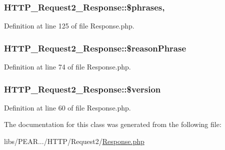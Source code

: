 \subsubsection[{\$phrases}]{\setlength{\rightskip}{0pt plus 5cm}H\+T\+T\+P\+\_\+\+Request2\+\_\+\+Response\+::\$phrases\hspace{0.3cm}{\ttfamily [static]}, {\ttfamily [protected]}}\label{classHTTP__Request2__Response_ad9a8fd735e8dc89eb7afc73750ec0bbc}


Definition at line 125 of file Response.\+php.

\hypertarget{classHTTP__Request2__Response_ab9faa50ba9b9f208a02a7c4ce75b391a}{}
\subsubsection[{\$reason\+Phrase}]{\setlength{\rightskip}{0pt plus 5cm}H\+T\+T\+P\+\_\+\+Request2\+\_\+\+Response\+::\$reason\+Phrase\hspace{0.3cm}{\ttfamily [protected]}}\label{classHTTP__Request2__Response_ab9faa50ba9b9f208a02a7c4ce75b391a}


Definition at line 74 of file Response.\+php.

\hypertarget{classHTTP__Request2__Response_aadbcb4df3711846a3b890c5492c4ffe7}{}
\subsubsection[{\$version}]{\setlength{\rightskip}{0pt plus 5cm}H\+T\+T\+P\+\_\+\+Request2\+\_\+\+Response\+::\$version\hspace{0.3cm}{\ttfamily [protected]}}\label{classHTTP__Request2__Response_aadbcb4df3711846a3b890c5492c4ffe7}


Definition at line 60 of file Response.\+php.



The documentation for this class was generated from the following file\+:\begin{DoxyCompactItemize}
\item 
libs/\+P\+E\+A\+R.../\+H\+T\+T\+P/\+Request2/\hyperlink{Response_8php}{Response.\+php}\end{DoxyCompactItemize}
